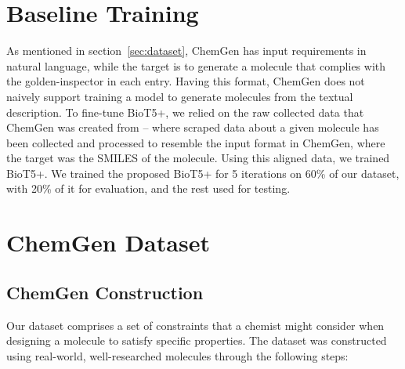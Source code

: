 \documentclass[10pt]{article} %
\begin{document}
    \section{Baseline Training}
    \label{app:baseline_finetuning}

    As mentioned in section~\ref{sec:dataset}, ChemGen has input requirements in natural language, while the target is to generate a molecule that complies with the golden-inspector in each entry. Having this format, ChemGen does not naively support training a model to generate molecules from the textual description. To fine-tune BioT5+, we relied on the raw collected data that ChemGen was created from -- where scraped data about a given molecule has been collected and processed to resemble the input format in ChemGen, where the target was the SMILES of the molecule. Using this aligned data, we trained BioT5+. We trained the proposed BioT5+ for 5 iterations on 60\% of our dataset, with 20\% of it for evaluation, and the rest used for testing.

    

    \section{ChemGen Dataset}
        \label{app:dataset_samples}
    \subsection{ChemGen Construction}
    Our dataset comprises a set of constraints that a chemist might consider when designing a molecule to satisfy specific properties\cite{guo2024takestangodirectlyoptimizing}. The dataset was constructed using real-world, well-researched molecules through the following steps:
    
\end{document}

